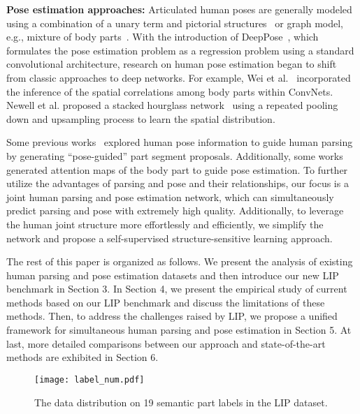 \documentclass[10pt,journal,compsoc]{IEEEtran}
\begin{document}
\textbf{Pose estimation approaches: }
Articulated human poses are generally modeled using a combination of a unary term and pictorial structures~\cite{andriluka2009pictorial} or graph model, e.g., mixture of body parts~\cite{YangR_CVPR_2011,Chen_NIPS14,ouyang2014multi}. With the introduction of DeepPose~\cite{deeppose13}, which formulates the pose estimation problem as a regression problem using a standard convolutional architecture, research on human pose estimation began to shift from classic approaches to deep networks. For example, Wei et al.~\cite{Wei_2016_CVPR} incorporated the inference of the spatial correlations among body parts within ConvNets. Newell et al. proposed a stacked hourglass network~\cite{newell2016stacked} using a repeated pooling down and upsampling process to learn the spatial distribution.

Some previous works~\cite{dong2014towards,xia2016pose} explored human pose information to guide human parsing by generating ``pose-guided'' part segment proposals. Additionally, some works~\cite{bulat2016human,Chu_2017_CVPR} generated attention maps of the body part to guide pose estimation. To further utilize the advantages of parsing and pose and their relationships, our focus is a joint human parsing and pose estimation network, which can simultaneously predict parsing and pose with extremely high quality. Additionally, to leverage the human joint structure more effortlessly and efficiently, we simplify the network and propose a self-supervised structure-sensitive learning approach.

{The rest of this paper is organized as follows. We present the analysis of existing human parsing and pose estimation datasets and then introduce our new LIP benchmark in Section 3. In Section 4, we present the empirical study of current methods based on our LIP benchmark and discuss the limitations of these methods. Then, to address the challenges raised by LIP, we propose a unified framework for simultaneous human parsing and pose estimation in Section 5. At last, more detailed comparisons between our approach and state-of-the-art methods are exhibited in Section 6.}


\begin{figure}[t]
\centering
   \texttt{[image: label\_num.pdf]}
\vspace{-8mm}
\caption{The data distribution on 19 semantic part labels in the LIP dataset.}
\vspace{-4mm}
\label{fig: dataset_analysis_label}
\end{figure}
\end{document}
